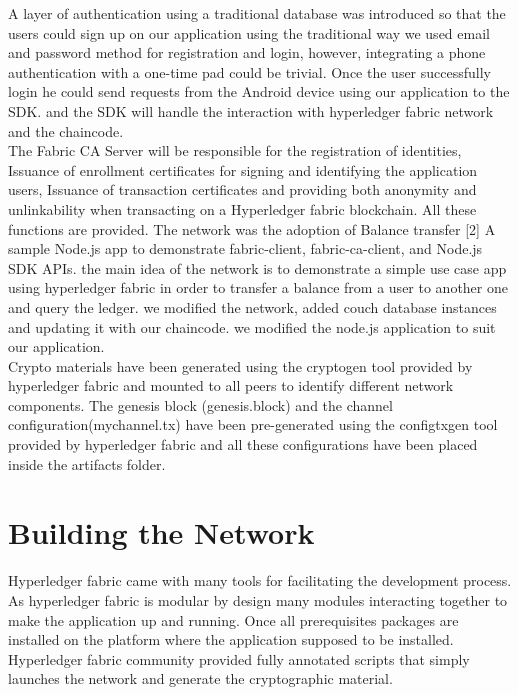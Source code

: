 A layer of authentication using a traditional database was introduced so that the users could sign up on our application using the traditional way we used email and password method for registration and login, however, integrating a phone authentication with a one-time pad could be trivial. 
Once the user successfully login he could send requests from the Android device using our application to the SDK. and the SDK will handle the interaction with hyperledger fabric network and the chaincode. \\
 
The Fabric CA Server will be responsible for the registration of identities, Issuance of enrollment certificates for signing and identifying the application users, Issuance of transaction certificates and providing both anonymity and unlinkability when transacting on a Hyperledger fabric blockchain. All these functions are provided.
The network was the adoption of Balance transfer [2] A sample Node.js app to demonstrate fabric-client, fabric-ca-client, and Node.js SDK APIs. 
the main idea of the network is to demonstrate a simple use case app using hyperledger fabric in order to transfer a balance from a user to another one and query the ledger. we modified the network, added couch database instances and updating it with our chaincode. we modified the node.js application to suit our application. \\ 

Crypto materials have been generated using the cryptogen tool provided by hyperledger fabric and mounted to all peers to identify different network components.
The genesis block (genesis.block) and the channel configuration(mychannel.tx) have been pre-generated using the configtxgen tool provided by hyperledger fabric and all these configurations have been placed inside the artifacts folder. 

\section{Building the Network} 

Hyperledger fabric came with many tools for facilitating the development process. As hyperledger fabric is modular by design many modules interacting together to make the application up and running.  
Once all prerequisites packages are installed on the platform where the application supposed to be installed. Hyperledger fabric community provided fully annotated scripts that simply launches the network and generate the cryptographic material. \\ 

